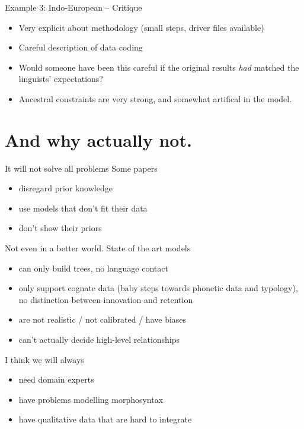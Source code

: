 \documentclass[9pt]{beamer}
\begin{document}
\begin{frame}{Example 3: Indo-European – Critique}
  \begin{itemize}
  \item Very explicit about methodology (small steps, driver files available)
  \item Careful description of data coding
  \item Would someone have been this careful if the original results \emph{had}
    matched the linguists' expectations?
  \item Ancestral constraints are very strong, and somewhat artifical in the
    model.
  \end{itemize}
\end{frame}
\section{And why actually not.}
\begin{frame}{It will not solve all problems}
  Some papers
  \begin{itemize}
  \item disregard prior knowledge
  \item use models that don't fit their data
  \item don't show their priors
  \end{itemize}
\end{frame}
\begin{frame}{Not even in a better world.}
  State of the art models
  \begin{itemize}
  \item can only build trees, no language contact
    \pause
  \item only support cognate data (baby steps towards phonetic data and typology),
    \pause no distinction between innovation and retention
    \pause 
  \item are not realistic / not calibrated / have biases
    \pause
  \item can't actually decide high-level relationships
  \end{itemize}
  \pause
  I think we will always
  \begin{itemize}
  \item need domain experts
  \item have problems modelling morphosyntax
  \item have qualitative data that are hard to integrate
  \end{itemize}
\end{frame}
\end{document}
